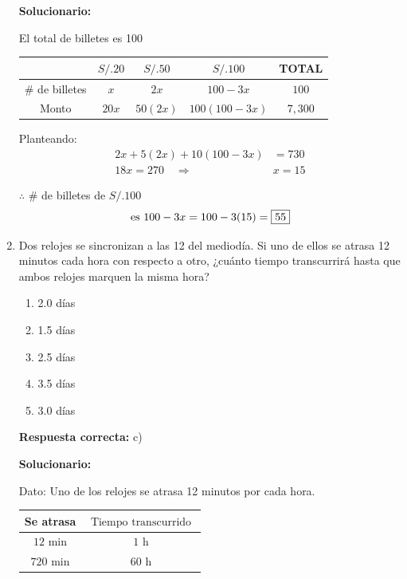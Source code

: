 \begin{enumerate}[resume]
	\vspace{2mm}

	\textbf{Solucionario:}

	El total de billetes es 100
	\begin{center}
		\begin{tabular}{|c|c|c|c|c|}
			\hline
			& $S/. 20$ & $S/. 50$ & $S/. 100$ & TOTAL \\ \hline
			\# de billetes & $x$ & $2x$ & $100 - 3x$ & $100$ \\ \hline
			Monto & $20x$ & $50(2x)$ & $100(100 - 3x)$ & $7,300$ \\ \hline
		\end{tabular}
	\end{center}

	Planteando:
	\begin{align*}
		2x + 5(2x) + 10(100 - 3x) &= 730 \\
		18x = 270 \quad \Rightarrow \quad &x = 15
	\end{align*}

	$\therefore$ \# de billetes de $S/. 100$
	\begin{equation*}
		\text{es } 100 - 3x = 100 - 3(15) = \fbox{55}
	\end{equation*}




	\vspace{6mm}

	\item Dos relojes se sincronizan a las 12 del mediodía. Si uno de ellos se atrasa 12 minutos cada hora con respecto a otro, ¿cuánto tiempo transcurrirá hasta que ambos relojes marquen la misma hora?
	\begin{enumerate}[label=\alph*)]
		\item 2.0 días
		\item 1.5 días
		\item 2.5 días
		\item 3.5 días
		\item 3.0 días
	\end{enumerate}
	\textbf{Respuesta correcta:} c)

	\vspace{2mm}

	\textbf{Solucionario:}

	Dato: Uno de los relojes se atrasa 12 minutos por cada hora.

	\begin{center}
		\begin{tabular}{c|c}
			Se atrasa & $ \text{ Tiempo transcurrido }$ \\ \hline
			$12 \text{ min}$ & $1 \text{ h}$ \\
			$720 \text{ min}$ & $60 \text{ h}$
		\end{tabular}
	\end{center}


\end{enumerate}
